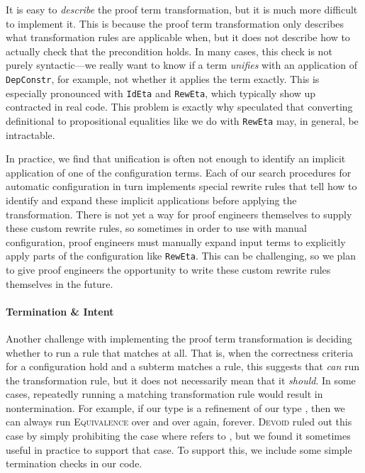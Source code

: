 It is easy to \textit{describe} the proof term transformation, but it is much more difficult to implement it.
This is because the proof term transformation only describes what transformation rules are applicable when,
but it does not describe how to actually check that the precondition holds.
In many cases, this check is not purely syntactic---we really want to know if a term \textit{unifies}
with an application of \lstinline{DepConstr}, for example, not whether it applies the term exactly.
This is especially pronounced with \lstinline{IdEta} and \lstinline{RewEta},
which typically show up contracted in real code.
This problem is exactly why \citet{tabareau2019marriage} speculated that converting definitional to propositional equalities
like we do with \lstinline{RewEta} may, in general, be intractable.

In practice, we find that unification is often not enough to identify an implicit application of one of the configuration terms.
Each of our search procedures for automatic configuration in turn implements special rewrite rules that tell \toolname
how to identify and expand these implicit applications before applying the transformation.
There is not yet a way for proof engineers themselves to supply these custom rewrite rules,
so sometimes in order to use \toolname with manual configuration, proof engineers must manually expand
input terms to explicitly apply parts of the configuration like \lstinline{RewEta}.
This can be challenging, so we plan to give proof engineers the opportunity to write
these custom rewrite rules themselves in the future.

\paragraph{Termination \& Intent}

Another challenge with implementing the proof term transformation is deciding whether to run a rule that matches at all.
That is, when the correctness criteria for a configuration hold and a subterm matches a rule, this suggests that \toolname \textit{can}
run the transformation rule, but it does not necessarily mean that it \textit{should}.
In some cases, repeatedly running a matching transformation rule would result in nontermination.
For example, if our type \B is a refinement of our type \A, then we can always run \textsc{Equivalence}
over and over again, forever.
\textsc{Devoid} ruled out this case by simply prohibiting the case where \B refers to \A, but we found it sometimes
useful in practice to support that case.
To support this, we include some simple termination checks in our code.

